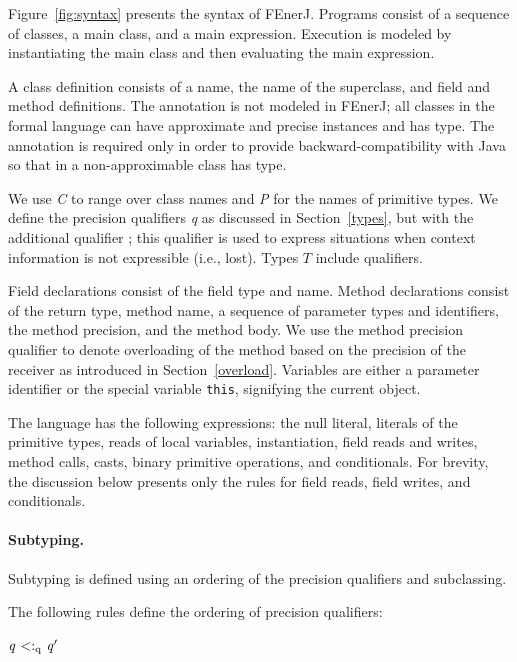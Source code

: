 Figure~\ref{fig:syntax} presents the syntax of FEnerJ.
Programs consist of a sequence of classes, a main class, and a main
expression. Execution is modeled by instantiating
the main class and then evaluating the main expression.

A class definition consists of a name, the name of the superclass, and
field and method definitions.
The  annotation is not modeled in FEnerJ; all classes in
the formal language can have approximate and precise instances and
 has  type.
The annotation is required only in order
to provide backward-compatibility with Java so that  in a
non-approximable class has  type.

We use \textit{C} to range over class names and \textit{P} for the
names of primitive types.
We define the precision qualifiers \textit{q} as discussed in Section~\ref{types},
but with the additional qualifier \lost{}; this qualifier is used to
express situations when context information is not expressible
(i.e., lost).
Types $T$ include qualifiers.

Field declarations consist of the field type and name.
Method declarations consist of the return type, method name, a
sequence of parameter types and identifiers, the method precision, and
the method body. We use the method precision qualifier to denote
overloading of the method based on the precision of the receiver as
introduced in Section~\ref{overload}.
Variables are either a parameter identifier or the special variable
\texttt{this}, signifying the current object.

The language has the following expressions:
the null literal,
literals of the primitive types,
reads of local variables,
instantiation,
field reads and writes,
method calls,
casts,
binary primitive operations, and
conditionals.
For brevity, the discussion below presents only the
rules for field reads, field writes, and conditionals.


\paragraph{Subtyping.}
Subtyping is defined using an ordering of the precision qualifiers and
subclassing.

\renewcommand{\ottdrulename}[1]{}

The following rules define the ordering of precision qualifiers:

\vspace{0.5ex}
\noindent
\begin{ottdefnblock}[#1]{$ \mathit{q} \  \textsf{$<:_{\mathrm{q}}$} \  \mathit{q'} $}{}
\ottusedrule{\ottdruleqqXXlost{}} \hspace{1em}
\ottusedrule{\ottdruleqqXXtop{}} \hspace{1em}
\ottusedrule{\ottdruleqqXXrefl{}}\\
\end{ottdefnblock}

